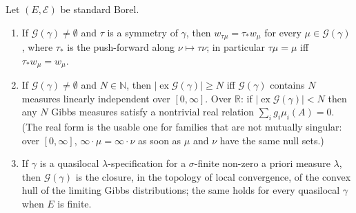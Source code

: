 \begin{corollary}[Georgii (7.28)--(7.30)]
    \label{cor:ext-728-730}
    \leanok

    Let $(E, \mathcal{E})$ be standard Borel.
    \begin{enumerate}
        \item[(7.28)] If $\mathcal{G}(\gamma) \neq \emptyset$ and $\tau$ is a symmetry of
          $\gamma$, then $w_{\tau\mu} = \tau_* w_\mu$ for every $\mu \in \mathcal{G}(\gamma)$,
          where $\tau_*$ is the push-forward along $\nu \mapsto \tau\nu$; in particular
          $\tau\mu = \mu$ iff $\tau_* w_\mu = w_\mu$.
        \item[(7.29)] If $\mathcal{G}(\gamma) \neq \emptyset$ and $N \in \mathbb{N}$, then
          $|\operatorname{ex}\mathcal{G}(\gamma)| \geq N$ iff $\mathcal{G}(\gamma)$ contains $N$
          measures linearly independent over $[0, \infty]$. Over $\mathbb{R}$: if
          $|\operatorname{ex}\mathcal{G}(\gamma)| < N$ then any $N$ Gibbs measures satisfy a
          nontrivial real relation $\sum_i g_i \mu_i(A) = 0$. (The real form is the usable one for
          families that are not mutually singular: over $[0,\infty]$, $\infty \cdot \mu =
          \infty \cdot \nu$ as soon as $\mu$ and $\nu$ have the same null sets.)
        \item[(7.30)] If $\gamma$ is a quasilocal $\lambda$-specification for a $\sigma$-finite
          non-zero a priori measure $\lambda$, then $\mathcal{G}(\gamma)$ is the closure, in the
          topology of local convergence, of the convex hull of the limiting Gibbs distributions;
          the same holds for every quasilocal $\gamma$ when $E$ is finite.
    \end{enumerate}
\end{corollary}
